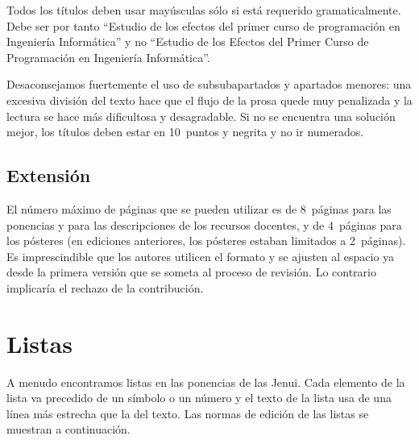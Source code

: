 \documentclass[twocolumn,twoside,a4paper, 10pt]{article}
\begin{document}
Todos los títulos deben usar mayúsculas sólo si está requerido
gramaticalmente.  Debe ser por tanto ``Estudio de los efectos del
primer curso de programación en Ingeniería Informática'' y no
``Estudio de los Efectos del Primer Curso de Programación en
Ingeniería Informática''.

Desaconsejamos fuertemente el uso de subsubapartados y apartados
menores: una excesiva división del texto hace que el flujo de la prosa
quede muy penalizada y la lectura se hace más dificultosa y
desagradable.  Si no se encuentra una solución mejor, los títulos
deben estar en 10~puntos y negrita y no ir numerados.

\subsection{Extensión}

El número máximo de páginas que se pueden utilizar es de 8~páginas para las ponencias 
y para las descripciones de los recursos docentes, y de 4~páginas para los pósteres 
(en ediciones anteriores, los pósteres estaban limitados a 2~páginas). 
Es imprescindible que los autores utilicen el formato y se ajusten al espacio ya 
desde la primera versión que se someta al proceso de revisión. Lo contrario implicaría 
el rechazo de la contribución.

\section{Listas}

A menudo encontramos listas en las ponencias de las Jenui. 
Cada elemento de la lista va precedido de un símbolo o un número y 
el texto de la lista usa de una línea más estrecha que la del texto. 
Las normas de edición de las listas se muestran a continuación.
\end{document}
